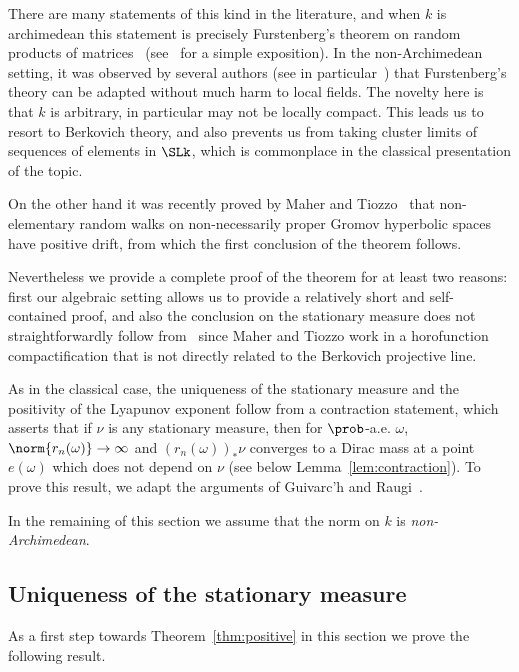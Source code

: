 There are many statements of this kind in the literature, and when $k$ is archimedean this statement is precisely Furstenberg's theorem on random products of matrices~\cite{furstenberg} (see~\cite[Chap.~II]{bougerol-lacroix} for a simple exposition). In the non-Archimedean setting, it was observed by several authors (see in particular~\cite{guivarch}) that Furstenberg's theory can be adapted without much harm to local fields. The novelty here is that $k$ is arbitrary, in particular may not be locally compact. This leads us to resort to Berkovich theory, and also prevents us from taking cluster limits of sequences of elements in $\SLk$, which is commonplace in the classical presentation of the topic.

On the other hand it was recently proved by Maher and Tiozzo~\cite{maher-tiozzo} that non-elementary random walks on non-necessarily proper Gromov hyperbolic spaces have positive drift, from which the first conclusion of the theorem follows.

Nevertheless we provide a complete proof of the theorem for at least two reasons: first our algebraic setting allows us to provide a relatively short and self-contained proof, and also the conclusion on the stationary measure does not straightforwardly follow from~\cite{maher-tiozzo} since Maher and Tiozzo work in a horofunction compactification that is not directly related to the Berkovich projective line.


As in the classical case, the uniqueness of the stationary measure and the positivity of the Lyapunov exponent follow from a contraction statement, which asserts that if $\nu$ is any stationary measure, then for $\prob$-a.e. $\omega$, $\norm{r_n(\omega)}\to \infty$ and $(r_n(\omega))_*\nu$ converges to a Dirac mass at a point ${e(\omega)}$ which does not depend on $\nu$ (see below Lemma~\ref{lem:contraction}). To prove this result, we adapt the arguments of Guivarc'h and Raugi~\cite{guivarch-raugi}.

In the remaining of this section we assume that the norm on $k$ is \emph{non-Archimedean}.

\subsection{Uniqueness of the stationary measure} \label{subs:abstract2}

As a first step towards Theorem~\ref{thm:positive} in this section we prove the following result.

